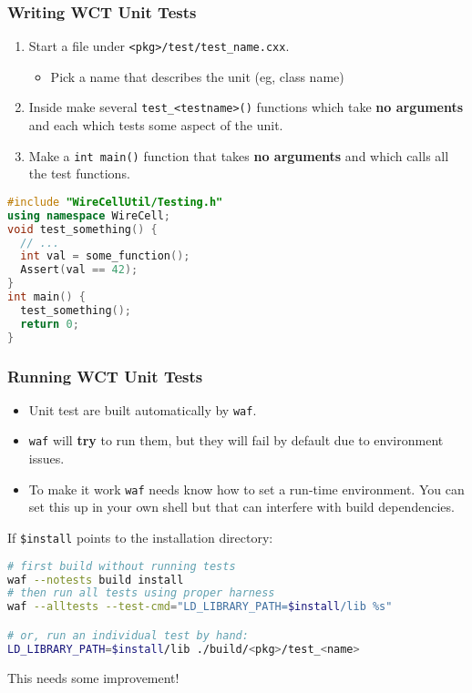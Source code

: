 \documentclass[xcolor=dvipsnames]{beamer}
\begin{document}
\begin{frame}[fragile]
  \frametitle{Writing WCT Unit Tests}
  \begin{enumerate}
  \item Start a file under \texttt{<pkg>/test/test\_name.cxx}.
    \begin{itemize}\footnotesize
    \item Pick a name that describes the unit (eg, class name)
    \end{itemize}
  \item Inside make several \texttt{test\_<testname>()} functions which
    take \textbf{no arguments} and each which tests some aspect of the unit.
  \item Make a \texttt{int main()} function that takes \textbf{no arguments}
    and which calls all the test functions.
  \end{enumerate}

\begin{lstlisting}[language=c++]
#include "WireCellUtil/Testing.h"
using namespace WireCell;
void test_something() {
  // ...
  int val = some_function();
  Assert(val == 42);
}
int main() {
  test_something();
  return 0;
}
\end{lstlisting}

\end{frame}

\begin{frame}[fragile]
  \frametitle{Running WCT Unit Tests}

  \footnotesize
  \begin{itemize}
  \item Unit test are built automatically by \texttt{waf}.
  \item \texttt{waf} will \textbf{try} to run them, but they will fail
    by default due to environment issues.
  \item To make it work \texttt{waf} needs know how to set a run-time
    environment.  You can set this up in your own shell but that can
    interfere with build dependencies.
  \end{itemize}

  If \texttt{\$install} points to the installation directory:

\begin{lstlisting}[language=sh]
# first build without running tests
waf --notests build install
# then run all tests using proper harness
waf --alltests --test-cmd="LD_LIBRARY_PATH=$install/lib %s"

# or, run an individual test by hand:
LD_LIBRARY_PATH=$install/lib ./build/<pkg>/test_<name>
\end{lstlisting}

  This needs some improvement!
\end{frame}
\end{document}
